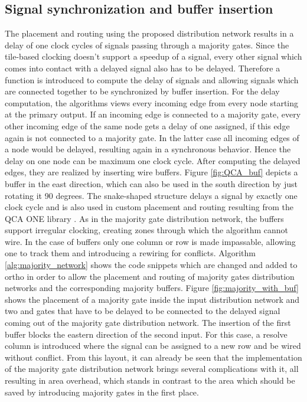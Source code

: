 \subsection{Signal synchronization and buffer insertion}
The placement and routing using the proposed distribution network results in a delay of one clock cycles of signals passing through a majority gates. Since the tile-based clocking doesn't support a speedup of a signal, every other signal which comes into contact with a delayed signal also has to be delayed. Therefore a function is introduced to compute the delay of signals and allowing signals which are connected together to be synchronized by buffer insertion. For the delay computation, the algorithms views every incoming edge from every node starting at the primary output. If an incoming edge is connected to a majority gate, every other incoming edge of the same node gets a delay of one assigned, if this edge again is not connected to a majority gate. In the latter case all incoming edges of a node would be delayed, resulting again in a synchronous behavior. Hence the delay on one node can be maximum one clock cycle. After computing the delayed edges, they are realized by inserting wire buffers. Figure \ref{fig:QCA_buf} depicts a buffer in the east direction, which can also be used in the south direction by just rotating it 90 degrees. The snake-shaped structure delays a signal by exactly one clock cycle and is also used in custom placement and routing resulting from the QCA ONE library \cite{QCA_scl}. As in the majority gate distribution network, the buffers support irregular clocking, creating zones through which the algorithm cannot wire. In the case of buffers only one column or row is made impassable, allowing one to track them and introducing a rewiring for conflicts. Algorithm \ref{alg:majority_network} shows the code snippets which are changed and added to ortho in order to allow the placement and routing of majority gates distribution networks and the corresponding majority buffers. Figure \ref{fig:majority_with_buf} shows the placement of a majority gate inside the input distribution network and two and gates that have to be delayed to be connected to the delayed signal coming out of the majority gate distribution network. The insertion of the first buffer blocks the eastern direction of the second input. For this case, a resolve column is introduced where the signal can be assigned to a new row and be wired without conflict. From this layout, it can already be seen that the implementation of the majority gate distribution network brings several complications with it, all resulting in area overhead, which stands in contrast to the area which should be saved by introducing majority gates in the first place.

